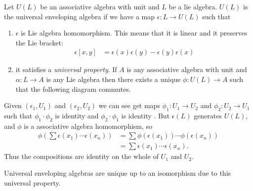 Let $U(L)$ be an associative algebra with unit and $L$ be a lie algebra. $U(L)$ is the universal enveloping algebra if we have a map $\epsilon: L\to U(L)$ such that
\begin{enumerate}
    \makethislistcompact
    \item $\epsilon$ is Lie algebra homomorphism. This means that it is linear and it preserves the Lie bracket:
        \begin{align}
            \epsilon[x,y] &= \epsilon(x)\epsilon(y) - \epsilon(y) \epsilon(x)
        \end{align}
    \item it satisfies a \emph{universal property}. If $A$ is any associative algebra with unit and $\alpha: L \to A $ is any Lie algebra then there exists a unique $\phi: U(L)\to A$ such that the following diagram commutes.
        \begin{center}
        \end{center}
\end{enumerate}
\begin{insight}
    Given $(\epsilon_1, U_1)$ and $(\epsilon_2,U_2)$ we can see get maps $\phi_1: U_1\to U_2$  and $\phi_2: U_2\to U_1$ such that 
    $\phi_1\cdot\phi_2$ is identity  and 
    $\phi_2\cdot\phi_1$ is identity . 
    But $\epsilon(L)$ generates $U(L)$, and $\phi$ is a associative algebra homomorphism, so 
    \begin{align}
        \phi\left(\sum \epsilon(x_1)\cdots\epsilon(x_n)\right) &= \sum \phi(\epsilon(x_1))\cdots\phi(\epsilon(x_n))\\
            &= \sum \epsilon(x_1)\cdots\epsilon(x_n).
    \end{align}
    Thus the compositions are identity on the whole of $U_1$ and $U_2$.
    
\end{insight}
Universal enveloping algebras are unique up to an isomorphism due to this universal property.

